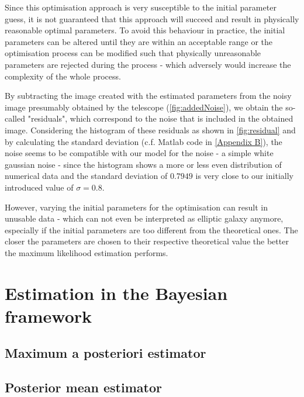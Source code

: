 Since this optimisation approach is very susceptible to the initial parameter guess, it is not guaranteed that this approach will succeed and result in physically reasonable optimal parameters. To avoid this behaviour in practice, the initial parameters can be altered until they are within an acceptable range or the optimisation process can be modified such that physically unreasonable parameters are rejected during the process - which adversely would increase the complexity of the whole process.

By subtracting the image created with the estimated parameters from the noisy image presumably obtained by the telescope (\cref{fig:addedNoise}), we obtain the so-called "residuals", which correspond to the noise that is included in the obtained image.
Considering the histogram of these residuals as shown in \cref{fig:residual} and by calculating the standard deviation (c.f. Matlab code in \cref{Appendix B}), the noise seems to be compatible with our model for the noise - a simple white gaussian noise - since the histogram shows a more or less even distribution of numerical data and the standard deviation of $0.7949$ is very close to our initially introduced value of $\sigma = 0.8$.



However, varying the initial parameters for the optimisation can result in unusable data - which can not even be interpreted as elliptic galaxy anymore, especially if the initial parameters are too different from the theoretical ones. The closer the parameters are chosen to their respective theoretical value the better the maximum likelihood estimation performs.




\section{Estimation in the Bayesian framework}




\subsection{Maximum a posteriori estimator}

\subsection{Posterior mean estimator}


